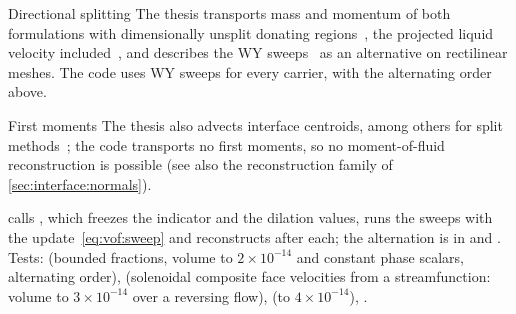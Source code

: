 \begin{deviation}{Directional splitting}
The thesis transports mass and momentum of both formulations with
dimensionally unsplit donating regions~, the
projected liquid velocity included~, and describes the
WY sweeps~ as an alternative on rectilinear meshes. The code
uses WY sweeps for every carrier, with the alternating order above.
\end{deviation}

\begin{deviation}{First moments}
The thesis also advects interface centroids, among others for split
methods~; the code transports no first moments, so no
moment-of-fluid reconstruction is possible (see also the reconstruction
family of \cref{sec:interface:normals}).
\end{deviation}

\begin{implnote}
calls , which freezes the indicator and
the dilation values, runs the sweeps with the update~\cref{eq:vof:sweep} and
reconstructs after each; the alternation is in
 and
. Tests:
(bounded fractions, volume to $2\times10^{-14}$ and constant phase scalars,
alternating order),
(solenoidal composite face velocities from a streamfunction: volume to
$3\times10^{-14}$ over a reversing flow),
(to $4\times10^{-14}$),
.
\end{implnote}

